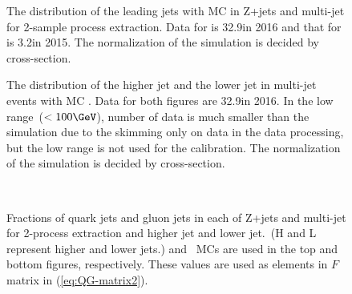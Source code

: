 \begin{figure}[htb]
  \centering
   \quad
  \caption[]{
    The \pt distribution of the leading jets with  MC in  Z+jets 
    and  multi-jet for 2-sample process extraction. %
    Data for  is 32.9\ifb in 2016 and that for  is 3.2\ifb in 2015.
    The normalization of the simulation is decided by cross-section.
    \label{fig:QG-2samplePt}
    }
\end{figure}

\begin{figure}[htb]
  \centering
   \quad
  \caption[]{
    The \pt distribution of  the higher \abseta jet %
    and  the lower \abseta jet in multi-jet events with  MC . %
    Data for both figures are 32.9\ifb in 2016. %
    In the low \pt range~($<100\GeV$), number of data is much smaller than the simulation due to the \pt skimming only on data in the data processing, %
    but the low \pt range is not used for the calibration.
    The normalization of the simulation is decided by cross-section.
    \label{fig:QG-jetHLPt}
    }
\end{figure}


\begin{figure}[htb]
  \centering
   \quad
  \\ \quad
  \caption[]{
    Fractions of quark jets and gluon jets in each of  Z+jets and multi-jet for 2-process extraction %
    and  higher \abseta jet and lower \abseta jet.~(H and L represent higher and lower \abseta jets.) %
     and \sherpa~MCs are used in the top and bottom figures, respectively.
    These values are used as elements in $F$ matrix in (\ref{eq:QG-matrix2}). %
    \label{fig:QG-Fmc}
    }
\end{figure}



